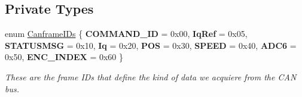 \subsection*{Private Types}
\begin{DoxyCompactItemize}
\item 
\mbox{\label{classblmc__drivers_1_1CanBusMotorBoard_addbf32fe0b6fa57134546c1f6ec5eb80}} 
enum \hyperlink{classblmc__drivers_1_1CanBusMotorBoard_addbf32fe0b6fa57134546c1f6ec5eb80}{Canframe\+I\+Ds} \{ \newline
{\bfseries C\+O\+M\+M\+A\+N\+D\+\_\+\+ID} = 0x00, 
{\bfseries Iq\+Ref} = 0x05, 
{\bfseries S\+T\+A\+T\+U\+S\+M\+SG} = 0x10, 
{\bfseries Iq} = 0x20, 
\newline
{\bfseries P\+OS} = 0x30, 
{\bfseries S\+P\+E\+ED} = 0x40, 
{\bfseries A\+D\+C6} = 0x50, 
{\bfseries E\+N\+C\+\_\+\+I\+N\+D\+EX} = 0x60
 \}\begin{DoxyCompactList}\small\item\em These are the frame I\+Ds that define the kind of data we acquiere from the C\+AN bus. \end{DoxyCompactList}
\end{DoxyCompactItemize}
